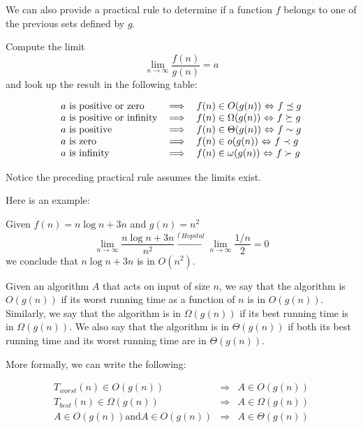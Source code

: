 \documentclass[justified,sixbynine]{tufte-book}
\theoremstyle{plain}%
\theoremstyle{definition}
\theoremstyle{remark}
\begin{document}
\begin{fullwidth}
We can also provide a practical rule to determine if a function $f$ belongs to one of the previous sets defined by $g$.

Compute the limit
\begin{equation}
\lim_{n\rightarrow \infty }\frac{f(n)}{g(n)}=a
\end{equation}
and look up the result in the following table:

\begin{equation}
\begin{tabular}{lll}
$a$ is positive or zero & $\Longrightarrow $ & $f(n)\in O(g(n))$ $%
\Leftrightarrow $ $f\preceq g$ \\
$a$ is positive or infinity & $\Longrightarrow $ & $f(n)\in \Omega (g(n))$ $%
\Leftrightarrow $ $f\succeq g$ \\
$a$ is positive & $\Longrightarrow $ & $f(n)\in \Theta (g(n))$ $%
\Leftrightarrow $ $f\sim g$ \\
$a$ is zero & $\Longrightarrow $ & $f(n)\in o(g(n))$ $\Leftrightarrow $ $%
f\prec g$ \\
$a$ is infinity & $\Longrightarrow $ & $f(n)\in \omega (g(n))$ $%
\Leftrightarrow $ $f\succ g$%
\end{tabular}
\end{equation}

Notice the preceding practical rule assumes the limits exist.

Here is an example:

Given $f(n) = n\log n+3n$ and $g(n) = n^2$
\begin{equation}
\lim_{n\rightarrow \infty }\frac{n\log n+3n}{n^2}\stackrel{l^{\prime }Hopital%
}{\longrightarrow }\lim_{n\rightarrow \infty }\frac{1/n}2=0
\end{equation}
we conclude that $n\log n+3n$ is in $O(n^2)$.



Given an algorithm $A$ that acts on input of size $n$, we say that the algorithm is $O(g(n))$ if its worst running time as a function of $n$ is in $O(g(n))$. Similarly, we say that the algorithm is in $\Omega(g(n))$ if its best running time is in $\Omega(g(n))$. We also say that the algorithm is in $ \Theta(g(n))$ if both its best running time and its worst running time are in  $\Theta(g(n))$.

More formally, we can write the following:

\begin{eqnarray}
T_{worst}(n) \in O(g(n)) &\Rightarrow& A \in O(g(n)) \\
T_{best}(n) \in \Omega(g(n)) &\Rightarrow& A \in \Omega(g(n)) \\
A \in O(g(n)) \textrm{and} A \in O(g(n))  &\Rightarrow& A \in \Theta(g(n)) \\
\end{eqnarray}


\end{fullwidth}
\end{document}
